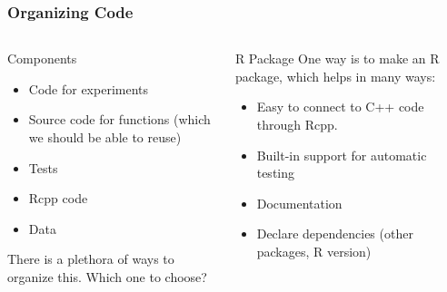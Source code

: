 \documentclass[aspectratio=1610,onlytextwidth]{beamer}
\begin{document}
\begin{frame}[c]
  \frametitle{Organizing Code}

  \begin{columns}[T]
    \begin{column}{0.45\textwidth}
      \begin{block}{Components}
        \begin{itemize}
          \item Code for experiments
          \item Source code for functions (which we should be able to reuse)
          \item Tests
          \item Rcpp code
          \item Data
        \end{itemize}
      \end{block}

      There is a plethora of ways to organize this. Which one to choose?
    \end{column}

    \pause

    \begin{column}{0.45\textwidth}
      \begin{block}{R Package}
        One way is to make an R package, which helps in many ways:
        \begin{itemize}
          \item Easy to connect to C++ code through Rcpp.
          \item Built-in support for automatic testing
          \item Documentation
          \item Declare dependencies (other packages, R version)
        \end{itemize}
      \end{block}
    \end{column}
  \end{columns}
\end{frame}
\end{document}
